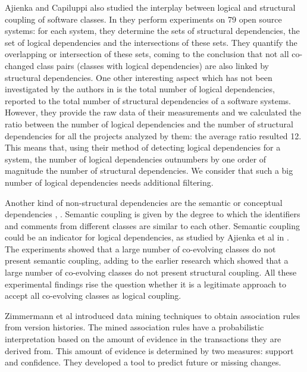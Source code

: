 \documentclass[12pt, a4paper, twoside]{report}
\begin{document}
Ajienka and Capiluppi also studied the interplay between logical and structural coupling of software classes. In \cite{DBLP:journals/jss/AjienkaC17} they  perform experiments on 79 open source systems: for each system, they determine the sets of structural dependencies, the set of logical dependencies and the intersections of these sets. They quantify the overlapping or intersection of these sets, coming to the conclusion that not all co-changed class pairs (classes with logical dependencies) are also linked by structural dependencies. One other interesting aspect which has not been investigated by the authors in \cite{DBLP:journals/jss/AjienkaC17}  is the total number of logical dependencies, reported to the total number of structural dependencies of a software systems. However, they provide the raw data of their measurements and we calculated the ratio between the number of logical dependencies and the number of structural dependencies for all the projects analyzed by them: the average ratio resulted 12.  This means that, using their method of detecting logical dependencies for a system, the number of logical dependencies outnumbers by one order of magnitude the number of structural dependencies. We consider that such a big number of logical dependencies needs additional filtering. 


Another kind of non-structural dependencies are the semantic or conceptual dependencies \cite{Poshyvanyk2009}, \cite{posh2010}. Semantic coupling is given by the degree to which the identifiers and comments from different classes are similar to each other. Semantic coupling could be an indicator for logical dependencies, as studied by Ajienka et al in \cite{DBLP:journals/ese/AjienkaCC18}. The experiments showed that a large number of co-evolving classes do not present semantic coupling, adding to the earlier research which showed that a large number of co-evolving classes do not present structural coupling. All these experimental findings rise the question whether it is a legitimate approach to accept all co-evolving classes as logical coupling.

Zimmermann et al \cite{Zimmermann:2004:MVH:998675.999460} introduced data mining techniques to obtain association rules from version histories.
The mined association rules  have a probabilistic interpretation based on the amount of evidence in the transactions they are derived from. This amount of evidence is determined by two measures: support and confidence.  They developed a tool to predict future or missing changes.
\end{document}
